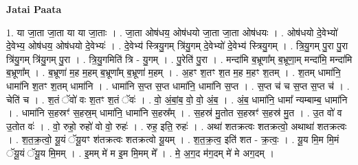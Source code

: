 \documentclass[17pt]{extarticle}
\begin{document}
\textbf{Jatai Paata} \newline

1. या जा॒ता जा॒ता या या जा॒ताः । . जा॒ता ओष॑धय॒ ओष॑धयो जा॒ता जा॒ता ओष॑धयः । . ओष॑धयो दे॒वेभ्यो॑ दे॒वेभ्य॒ ओष॑धय॒ ओष॑धयो दे॒वेभ्यः॑ । . दे॒वेभ्य॑ स्त्रियु॒गम् त्रि॑यु॒गम् दे॒वेभ्यो॑ दे॒वेभ्य॑ स्त्रियु॒गम् । . त्रि॒यु॒गम् पु॒रा पु॒रा त्रि॑यु॒गम् त्रि॑यु॒गम् पु॒रा । . त्रि॒यु॒गमिति॑ त्रि - यु॒गम् । . पु॒रेति॑ पु॒रा । . मन्दा॑मि ब॒भ्रूणा᳚म् ब॒भ्रूणा॒म् मन्दा॑मि॒ मन्दा॑मि ब॒भ्रूणा᳚म् । . ब॒भ्रूणा॑ म॒ह म॒हम् ब॒भ्रूणा᳚म् ब॒भ्रूणा॑ म॒हम् । . अ॒हꣳ श॒तꣳ श॒त म॒ह म॒हꣳ श॒तम् । . श॒तम् धामा॑नि॒ धामा॑नि श॒तꣳ श॒तम् धामा॑नि । . धामा॑नि स॒प्त स॒प्त धामा॑नि॒ धामा॑नि स॒प्त । . स॒प्त च॑ च स॒प्त स॒प्त च॑ । . चेति॑ च । . श॒तं ॅवो॑ वः श॒तꣳ श॒तं ॅवः॑ । . वो॒ अं॒बां॒ब॒ वो॒ वो॒ अं॒ब॒ । . अं॒ब॒ धामा॑नि॒ धामा᳚ न्यम्बाम्ब॒ धामा॑नि । . धामा॑नि स॒हस्रꣳ॑ स॒हस्र॒म् धामा॑नि॒ धामा॑नि स॒हस्र᳚म् । . स॒हस्र॑ मु॒तोत स॒हस्रꣳ॑ स॒हस्र॑ मु॒त । . उ॒त वो॑ व उ॒तोत वः॑ । . वो॒ रुहो॒ रुहो॑ वो वो॒ रुहः॑ । . रुह॒ इति॒ रुहः॑ । . अथा॑ शतक्रत्वः शतक्रत्वो॒ अथाथा॑ शतक्रत्वः । . श॒त॒क्र॒त्वो॒ यू॒यं ॅयू॒यꣳ श॑तक्रत्वः शतक्रत्वो यू॒यम् । . श॒त॒क्र॒त्व॒ इति॑ शत - क्र॒त्वः॒ । . यू॒य मि॒म मि॒मं ॅयू॒यं ॅयू॒य मि॒मम् । . इ॒मम् मे॑ म इ॒म मि॒मम् मे᳚ । . मे॒ अ॒ग॒द म॑ग॒दम् मे॑ मे अग॒दम् । \newline
\end{document}
